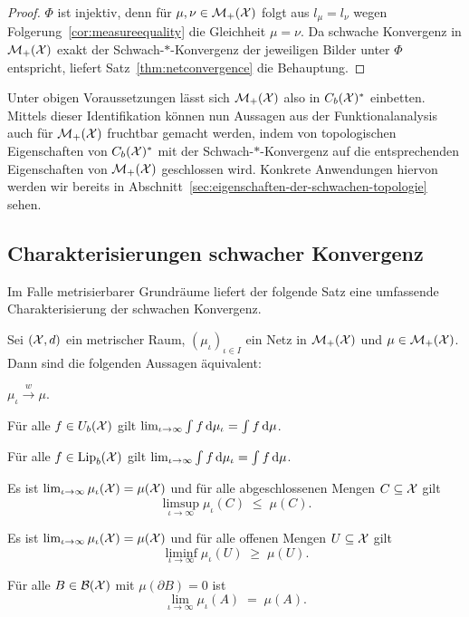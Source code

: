 \documentclass[../main/main.tex]{subfiles}
\begin{document}
	\begin{proof}
		$\Phi$ ist injektiv, denn für $\mu, \nu \in \mathcal{M}_{+}(\mathcal{X})$ folgt aus $l_\mu = l_\nu$ wegen Folgerung~\ref{cor:measureequality} die Gleichheit $\mu = \nu$. 
		Da schwache Konvergenz in $\mathcal{M}_{+}(\mathcal{X})$ exakt der Schwach-$\ast$-Konvergenz der jeweiligen Bilder unter $\Phi$ entspricht, liefert Satz~\ref{thm:netconvergence}
		die Behauptung.
	\end{proof}

	Unter obigen Voraussetzungen lässt sich $\mathcal{M}_{+}(\mathcal{X})$ also in $C_b(\mathcal{X})^\ast$ einbetten. Mittels dieser Identifikation können nun Aussagen aus der 
	Funktionalanalysis auch für $\mathcal{M}_{+}(\mathcal{X})$ fruchtbar gemacht werden, indem von topologischen Eigenschaften von
	$C_b(\mathcal{X})^\ast$ mit der Schwach-$\ast$-Konvergenz auf die entsprechenden Eigenschaften von 
	$\mathcal{M}_{+}(\mathcal{X})$ geschlossen wird. Konkrete Anwendungen hiervon werden wir bereits in Abschnitt~\ref{sec:eigenschaften-der-schwachen-topologie} sehen.
	
	\subsection{Charakterisierungen schwacher Konvergenz}
	\label{subsec:CharakterisierungenSchwacherKonvergenz}
	
	Im Falle metrisierbarer Grundräume liefert der folgende Satz eine umfassende Charakterisierung der schwachen Konvergenz.
	
	\begin{Satz}[Portmanteau]
		\label{thm:portmanteau}
		Sei $(\mathcal{X}, d)$ ein metrischer Raum, $(\mu_\iota)_{\iota \in I}$ ein Netz in $\mathcal{M}_{+}(\mathcal{X})$
		und $\mu \in \mathcal{M}_{+}(\mathcal{X})$. Dann sind die folgenden Aussagen äquivalent:
		\begin{equivalentthm}
			\item $\mu_\iota \xrightarrow{w} \mu$.
			\item Für alle $f \in U_b(\mathcal{X})$ gilt $\lim_{\iota \to \infty} \int_{} \, f \, \mathrm{d}\mu_\iota = \int_{} \, f \, \mathrm{d}\mu$.
			\item Für alle $f \in \mathrm{Lip}_b(\mathcal{X})$ gilt $\lim_{\iota \to \infty} \int_{} \, f \, \mathrm{d}\mu_\iota = \int_{} \, f \, \mathrm{d}\mu$.
			\item Es ist 
			$\lim_{\iota \to \infty} \mu_\iota(\mathcal{X}) = \mu(\mathcal{X})$
			und für alle abgeschlossenen Mengen $C \subseteq \mathcal{X}$ gilt 
			$$\limsup_{\iota \to \infty} \mu_\iota(C) \; \leq \; \mu(C) \text{.}$$
			\item Es ist 
			$\lim_{\iota \to \infty} \mu_\iota(\mathcal{X}) = \mu(\mathcal{X})$
			und für alle offenen Mengen $U \subseteq \mathcal{X}$ gilt 
			$$\liminf_{\iota \to \infty} \mu_\iota(U) \; \geq \; \mu(U) \text{.}$$
			\item Für alle $B \in \mathcal{B}(\mathcal{X})$ mit $\mu(\partial B) = 0$ 
			ist $$\lim_{\iota \to \infty} \mu_\iota(A) \; = \; \mu(A) \text{.}$$
		\end{equivalentthm}
	\end{Satz}
	
\end{document}
